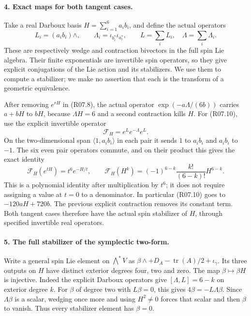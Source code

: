 \paragraph{4. Exact maps for both tangent cases.}
Take a real Darboux basis $H=\sum_{i=1}^6a_i b_i$, and define
the actual operators
\[
 L_i=(a_i b_i)\wedge,\qquad
 \Lambda_i=\iota_{b_i^*}\iota_{a_i^*},\qquad
 L=\sum_iL_i,\quad\Lambda=\sum_i\Lambda_i.
\]
These are respectively wedge and contraction bivectors in the
full spin Lie algebra. Their finite exponentials are invertible
spin operators, so they give explicit conjugations of the Lie
action and its stabilizers. We use them to compute a stabilizer;
we make no assertion that each is the transform of a geometric
equivalence.

After removing $e^{rH}$ in (R07.8), the actual operator
$\exp(-a\Lambda/(6b))$ carries $a+bH$ to $bH$, because
$\Lambda H=6$ and a second contraction kills $H$.
For (R07.10), use the explicit invertible operator
\[
                 \mathcal F_H=e^L e^{-\Lambda}e^L.
\]
On the two-dimensional span $\langle1,a_i b_i\rangle$ in
each pair it sends $1$ to $a_i b_i$ and $a_i b_i$ to $-1$.
The six even pair operators commute, and on their product this
gives the exact identity
\[
 \mathcal F_H(e^{tH})=t^6 e^{-H/t},\qquad
 \mathcal F_H(H^k)=(-1)^{6-k}\frac{k!}{(6-k)!}H^{6-k}.
                                                               \tag{R07.11}
\]
This is a polynomial identity after multiplication by $t^6$;
it does not require assigning a value at $t=0$ to a denominator.
In particular (R07.10) goes to $-120aH+720b$. The previous
explicit contraction removes its constant term. Both tangent
cases therefore have the actual spin stabilizer of $H$, through
specified invertible real operators.

\paragraph{5. The full stabilizer of the symplectic two-form.}
Write a general spin Lie element on $\bigwedge^*V$ as
$\beta\wedge+D_A-\operatorname{tr}(A)/2+\iota_\gamma$.
Its three outputs on $H$ have distinct exterior degrees four,
two and zero. The map $\beta\mapsto\beta H$ is injective.
Indeed the explicit Darboux operators give
$[\Lambda,L]=6-k$ on exterior degree $k$. For $\beta$ of
degree two with $L\beta=0$, this gives
$4\beta=-L\Lambda\beta$. Since $\Lambda\beta$ is a scalar,
wedging once more and using $H^2\ne0$ forces that scalar and
then $\beta$ to vanish. Thus every stabilizer element has
$\beta=0$.

